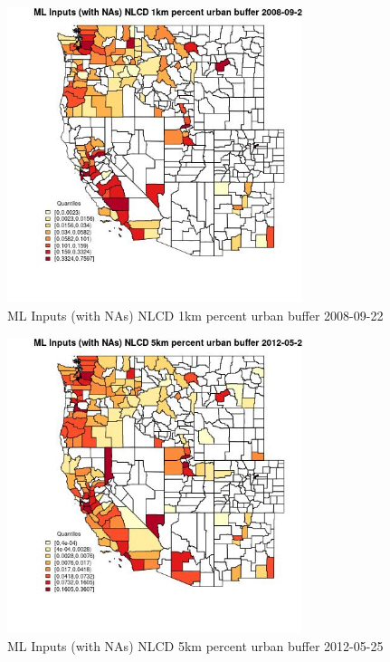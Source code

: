 \begin{figure} 
\centering  
\includegraphics[width=0.77\textwidth]{Code_Outputs/Report_ML_input_PM25_Step4_part_e_de_duplicated_aves_compiled_2019-05-18wNAs_CountyNLCD_1km_percent_urban_bufferMean2008-09-22_2008-09-22.jpg} 
\caption{\label{fig:Report_ML_input_PM25_Step4_part_e_de_duplicated_aves_compiled_2019-05-18wNAsCountyNLCD_1km_percent_urban_bufferMean2008-09-22_2008-09-22}ML Inputs (with NAs) NLCD 1km percent urban buffer 2008-09-22} 
\end{figure} 
 

\begin{figure} 
\centering  
\includegraphics[width=0.77\textwidth]{Code_Outputs/Report_ML_input_PM25_Step4_part_e_de_duplicated_aves_compiled_2019-05-18wNAs_CountyNLCD_5km_percent_urban_bufferMean2012-05-25_2012-05-25.jpg} 
\caption{\label{fig:Report_ML_input_PM25_Step4_part_e_de_duplicated_aves_compiled_2019-05-18wNAsCountyNLCD_5km_percent_urban_bufferMean2012-05-25_2012-05-25}ML Inputs (with NAs) NLCD 5km percent urban buffer 2012-05-25} 
\end{figure} 
 

